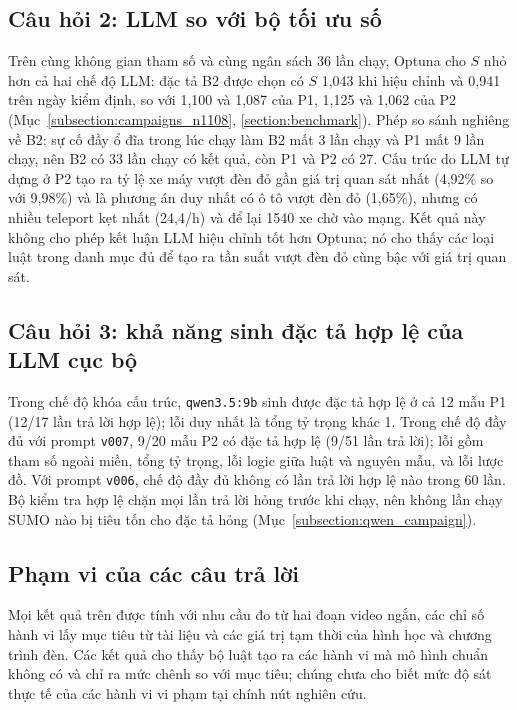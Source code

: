 \documentclass[../main.tex]{subfiles}
\begin{document}
\subsection{Câu hỏi 2: LLM so với bộ tối ưu số}

Trên cùng không gian tham số và cùng ngân sách 36 lần chạy, Optuna cho $S$ nhỏ hơn cả hai chế độ LLM: đặc tả B2 được chọn có $S$ 1,043 khi hiệu chỉnh và 0,941 trên ngày kiểm định, so với 1,100 và 1,087 của P1, 1,125 và 1,062 của P2 (Mục~\ref{subsection:campaigns_n1108}, \ref{section:benchmark}). Phép so sánh nghiêng về B2: sự cố đầy ổ đĩa trong lúc chạy làm B2 mất 3 lần chạy và P1 mất 9 lần chạy, nên B2 có 33 lần chạy có kết quả, còn P1 và P2 có 27. Cấu trúc do LLM tự dựng ở P2 tạo ra tỷ lệ xe máy vượt đèn đỏ gần giá trị quan sát nhất (4,92\% so với 9,98\%) và là phương án duy nhất có ô tô vượt đèn đỏ (1,65\%), nhưng có nhiều teleport kẹt nhất (24,4/h) và để lại 1540 xe chờ vào mạng. Kết quả này không cho phép kết luận LLM hiệu chỉnh tốt hơn Optuna; nó cho thấy các loại luật trong danh mục đủ để tạo ra tần suất vượt đèn đỏ cùng bậc với giá trị quan sát.

\subsection{Câu hỏi 3: khả năng sinh đặc tả hợp lệ của LLM cục bộ}

Trong chế độ khóa cấu trúc, \texttt{qwen3.5:9b} sinh được đặc tả hợp lệ ở cả 12 mẫu P1 (12/17 lần trả lời hợp lệ); lỗi duy nhất là tổng tỷ trọng khác 1. Trong chế độ đầy đủ với prompt \texttt{v007}, 9/20 mẫu P2 có đặc tả hợp lệ (9/51 lần trả lời); lỗi gồm tham số ngoài miền, tổng tỷ trọng, lỗi logic giữa luật và nguyên mẫu, và lỗi lược đồ. Với prompt \texttt{v006}, chế độ đầy đủ không có lần trả lời hợp lệ nào trong 60 lần. Bộ kiểm tra hợp lệ chặn mọi lần trả lời hỏng trước khi chạy, nên không lần chạy SUMO nào bị tiêu tốn cho đặc tả hỏng (Mục~\ref{subsection:qwen_campaign}).

\subsection{Phạm vi của các câu trả lời}

Mọi kết quả trên được tính với nhu cầu đo từ hai đoạn video ngắn, các chỉ số hành vi lấy mục tiêu từ tài liệu và các giá trị tạm thời của hình học và chương trình đèn. Các kết quả cho thấy bộ luật tạo ra các hành vi mà mô hình chuẩn không có và chỉ ra mức chênh so với mục tiêu; chúng chưa cho biết mức độ sát thực tế của các hành vi vi phạm tại chính nút nghiên cứu.
\end{document}

